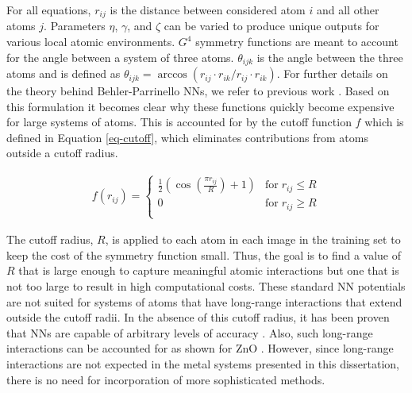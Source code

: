 \documentclass[12pt,oneside]{cmuthesis}
\begin{document}
For all equations, \(r_{ij}\) is the distance between considered atom \(i\) and all other atoms \(j\). Parameters \(\eta\), \(\gamma\), and \(\zeta\) can be varied to produce unique outputs for various local atomic environments. \(G^{4}\) symmetry functions are meant to account for the angle between a system of three atoms. \(\theta_{ijk}\) is the angle between the three atoms and is defined as \(\theta_{ijk} = \arccos(r_{ij} \cdot r_{ik} / r_{ij} \cdot r_{ik})\). For further details on the theory behind Behler-Parrinello NNs, we refer to previous work \cite{behler-2007-gener-neural,behler-2011-atom}. Based on this formulation it becomes clear why these functions quickly become expensive for large systems of atoms. This is accounted for by the cutoff function \(f\) which is defined in Equation \ref{eq-cutoff}, which eliminates contributions from atoms outside a cutoff radius.

\begin{eqnarray} \label{eq-cutoff}
f(r_{ij}) =
\begin{cases}
\frac{1}{2} \left(\cos\left(\frac{\pi r_{ij}}{R}\right) +1\right) & \textrm{for} \; r_{ij} \leq R \\
0 & \textrm{for} \; r_{ij} \geq R \\
\end{cases}
\end{eqnarray}

The cutoff radius, \(R\), is applied to each atom in each image in the training set to keep the cost of the symmetry function small. Thus, the goal is to find a value of \(R\) that is large enough to capture meaningful atomic interactions but one that is not too large to result in high computational costs. These standard NN potentials are not suited for systems of atoms that have long-range interactions that extend outside the cutoff radii. In the absence of this cutoff radius, it has been proven that NNs are capable of arbitrary levels of accuracy \cite{hornik-1989-multil}. Also, such long-range interactions can be accounted for as shown for ZnO \cite{artrith-2011-high}. However, since long-range interactions are not expected in the metal systems presented in this dissertation, there is no need for incorporation of more sophisticated methods.
\end{document}
